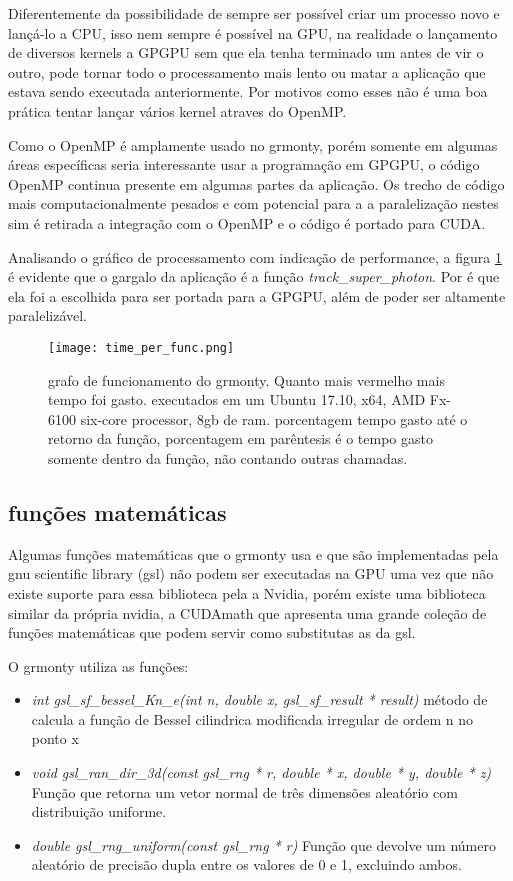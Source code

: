     Diferentemente da possibilidade de sempre ser possível criar um processo novo e lançá-lo a CPU, isso nem sempre é possível na GPU, na realidade o lançamento de diversos kernels a GPGPU sem que ela tenha terminado um antes de vir o outro, pode tornar todo o processamento mais lento ou matar a aplicação que estava sendo executada anteriormente. Por motivos como esses não é uma boa prática tentar lançar vários kernel atraves do OpenMP.

    Como o OpenMP é amplamente usado no grmonty, porém somente em algumas áreas específicas seria interessante usar a programação em GPGPU, o código OpenMP continua presente em algumas partes da aplicação. Os trecho de código mais computacionalmente pesados e com potencial para a a paralelização nestes sim é retirada a integração com o OpenMP e o código é portado para CUDA.

    Analisando o gráfico de processamento com indicação de performance, a figura \ref{fig:grmonty-performance} é evidente que o gargalo da aplicação é a função \textit{track\_super\_photon}. Por é que ela foi a escolhida para ser portada para a GPGPU, além de poder ser altamente paralelizável.

    \begin{figure}[!h]
      \centering
      \texttt{[image: time\_per\_func.png]}
      \caption{grafo de funcionamento do grmonty. Quanto mais vermelho mais tempo foi gasto. executados em um Ubuntu 17.10, x64, AMD Fx-6100 six-core processor, 8gb de ram. porcentagem tempo gasto até o retorno da função, porcentagem em parêntesis é o tempo gasto somente dentro da função, não contando outras chamadas.}
      \label{fig:grmonty-performance}
    \end{figure}

  \subsection{funções matemáticas}
    Algumas funções matemáticas que o grmonty usa e que são implementadas pela gnu scientific library (gsl) não podem ser executadas na GPU uma vez que não existe suporte para essa biblioteca pela a Nvidia, porém existe uma biblioteca similar da própria nvidia, a CUDAmath que apresenta uma grande coleção de funções matemáticas que podem servir como substitutas as da gsl.

    O grmonty utiliza as funções:
    \begin{itemize}
      \item \textit{int gsl\_sf\_bessel\_Kn\_e(int n, double x, gsl\_sf\_result * result)} método de calcula a função de Bessel cilindrica modificada irregular de ordem n no ponto x
      \item \textit{void gsl\_ran\_dir\_3d(const gsl\_rng * r, double * x, double * y, double * z)} Função que retorna um vetor normal de três dimensões aleatório com distribuição uniforme.
      \item \textit{double gsl\_rng\_uniform(const gsl\_rng * r)} Função que devolve um número aleatório de precisão dupla entre os valores de 0 e 1, excluindo ambos.
    \end{itemize}

